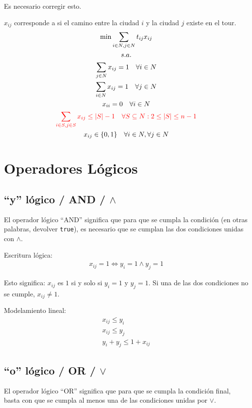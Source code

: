 \documentclass[../main.tex]{subfiles}
\begin{document}
Es necesario corregir esto. 

$x_{ij}$ corresponde a si el camino entre la ciudad $i$ y la ciudad $j$ existe en el tour.
\begin{gather*}
  \min \sum_{i \in N, j \in N} t_{ij} x_{ij} \\
  s.a. \\
  \sum_{j \in N} x_{ij} = 1 \quad \forall i \in N \\
  \sum_{i \in N} x_{ij} = 1 \quad \forall j \in N \\
  x_{ii} = 0 \quad \forall i \in N \\
  {\color{red} \sum_{i \in S, j \in S} x_{ij} \leq |S| - 1 \quad \forall S \subseteq N : 2 \leq |S| \leq n - 1} \\
  x_{ij} \in \{ 0,1 \} \quad \forall i \in N , \forall j \in N
\end{gather*}


\section{Operadores Lógicos}
\subsection[AND]{``y'' lógico / AND / $\wedge$}
El operador lógico ``AND'' significa que para que se cumpla la condición (en otras palabras, devolver \texttt{true}), es necesario que se cumplan las dos condiciones unidas con $\wedge$.

\begin{minipage}[t]{.45\textwidth}
  Escritura lógica:
  \begin{gather*}
    x_{ij} = 1 \Leftrightarrow y_i = 1 \wedge y_j = 1  
  \end{gather*}

  Esto significa: $x_{ij}$ es $1$ si y solo si $y_i = 1$ y $y_j = 1$. Si una de las dos condiciones no se cumple, $x_{ij} \not= 1$.
\end{minipage}
\hfill
\begin{minipage}[t]{.45\textwidth}
  Modelamiento lineal:
  \begin{gather*}
    x_{ij} \leq y_i \\
    x_{ij} \leq y_j \\
    y_i + y_j \leq 1 + x_{ij}
  \end{gather*}
\end{minipage}

\subsection[OR]{``o'' lógico / OR / $\vee$}
El operador lógico ``OR'' significa que para que se cumpla la condición final, basta con que se cumpla al menos una de las condiciones unidas por $\vee$.
\end{document}
